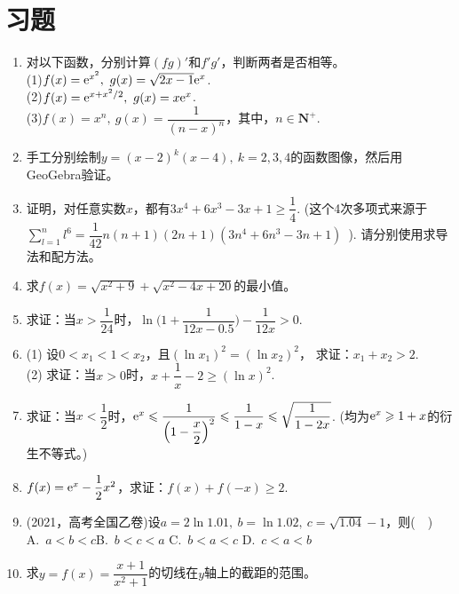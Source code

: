 
\section{习题} 
\begin{enumerate}[label={\textbf{\thechapter.\arabic*}},leftmargin=
    \inteval{\myenumleftmargin}pt]
\item 对以下函数，分别计算$ (fg)' $和$ f'g' $，判断两者是否相等。\\
(1)$ f(x)=\e^{x^2},\ g(x)=\sqrt{2x-1}\e^x $.\\
(2)$ f(x)=\e^{x+x^2/2},\ g(x)=x\e^x $. \\
(3)$ f(x)=x^n,\ g(x)=\dfrac{1}{(n-x)^n} $，其中，$ n\in \textbf{N}^+ $.

\item 手工分别绘制$ y=(x-2)^k(x-4),\ k=2,3,4 $的函数图像，然后用GeoGebra验证。

\item 证明，对任意实数$ x $，都有$ 3x^4+6x^3-3x+1\geq \dfrac{1}{4} $.
(这个4次多项式来源于$ \sum\limits_{l=1}^{n} l^6=
\dfrac{1}{42}n(n+1)(2n+1)(3n^4+6n^3-3n+1) $\ ). 
请分别使用求导法和配方法。

\item 求$ f(x)=\sqrt{x^2+9}+\sqrt{x^2-4x+20} $的最小值。

\item 求证：当$x>\dfrac{1}{24}$时，$\ln\Big(1+\dfrac{1}{12x-0.5}\Big)-
\dfrac{1}{12x}>0$. 

\item 
(1) 设$ 0<x_1<1<x_2 $，且$ (\ln x_1)^2=(\ln x_2)^2 $，
求证：$ x_1+x_2>2 $. \\
(2) 求证：当$x>0$时，$ x+\dfrac{1}{x}-2\geq (\ln x)^2 $. 

\item 求证：当$ x<\dfrac{1}{2} $时，$ \mathrm{e}^x\leqslant 
 \dfrac{1}{\Big(1-\dfrac{x}{2}\Big)^2}
\leqslant \dfrac{1}{1-x}\leqslant \sqrt{\dfrac{1}{1-2x}} $.
(均为$ \mathrm{e}^x\geqslant 1+x $的衍生不等式。)

\item $ f(x)=\mathrm{e}^x-\dfrac{1}{2}x^2 $，求证：$ f(x)+f(-x)\geq 2 $. 

\item (2021，高考全国乙卷)设$a=2\ln1.01,\ b=\ln1.02,\ c=\sqrt{1.04}-1 $，则(\ \ ) \\
A.\ $a<b<c$\q\q B.\ $b<c<a$ \q\q C.\ $b<a<c$ \q\q D.\ $c<a<b$ 

\item 求$ y=f(x)=\dfrac{x+1}{x^2+1} $的切线在$ y $轴上的截距的范围。


\end{enumerate}
